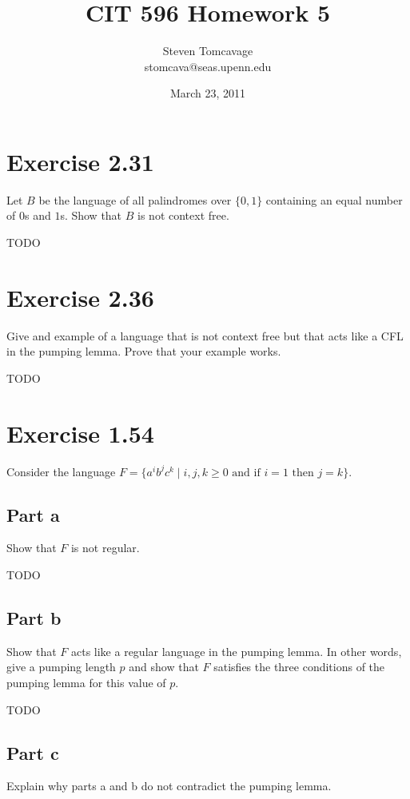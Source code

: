 \documentclass{article}
\title{CIT 596 Homework 5}
\author{Steven Tomcavage\\stomcava@seas.upenn.edu}
\date{March 23, 2011}
\newcommand{\where}{\mid}
\begin{document}
\maketitle

\section{Exercise 2.31}

Let $B$ be the language of all palindromes over $\{0, 1\}$ containing an equal
number of $0$s and $1$s. Show that $B$ is not context free.

TODO

\section{Exercise 2.36}

Give and example of a language that is not context free but that acts like a CFL
in the pumping lemma. Prove that your example works. 

TODO

\section{Exercise 1.54}

Consider the language $F = \{a^i b^j c^k \where i, j, k \geq 0 \text{ and if }
i = 1 \text{ then } j = k\}$. 

\subsection{Part a}
Show that $F$ is not regular.

TODO

\subsection{Part b}

Show that $F$ acts like a regular language in the pumping lemma. In other words,
give a pumping length $p$ and show that $F$ satisfies the three conditions of
the pumping lemma for this value of $p$.

TODO

\subsection{Part c}

Explain why parts a and b do not contradict the pumping lemma.
\end{document}
